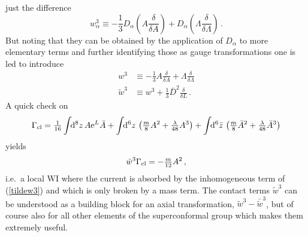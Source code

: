 \documentclass[a4paper,12pt]{article}
\newcommand{\e}{{\rm e}}
\newcommand{\dS}{\!\!{\rm d}^6z\,}
\newcommand{\dSb}{\!\!{\rm d}^6\bar z\,}
\newcommand{\dV}{\!\!{\rm d}^8z\,}
\newcommand{\Gcl}{\Gamma_{\rm cl}}
\newcommand{\al}{\alpha}
\newcommand{\tfr}[2]{{\textstyle \frac{#1}{#2}}}
\newcommand{\fdq}[2]{\frac{\delta #1}{\delta #2}}
\begin{document}
just the difference
\begin{equation}
w_\al^3 \equiv -\tfr{1}{3} D_\al \left( A \fdq{}{A} \right) + D_\al
\left(\Lambda \fdq{}{\Lambda}\right) \,.
\end{equation}
But noting that they can be obtained by the application of $D_\al$ to more
elementary terms and further identifying those as gauge transformations one
is led to introduce
\begin{align}
  w^3 &\equiv -\tfr{1}{3} A \fdq{}{A} + \Lambda \fdq{}{\Lambda} \\
\tilde w^3 &\equiv w^3 +\tfr{1}{3} \bar D^2 \fdq{}{L} \,.
\label{tildew3}
\end{align}
A quick check on
\begin{equation}
\Gcl = \tfr{1}{16} \int \dV A \e^{L} \bar A 
+ \int \dS \left(\tfr{m}{8} A^2 +
  \tfr{\lambda}{48} A^3 \right) 
 + \int \dSb \left(\tfr{m}{8} \bar A^2 +   \tfr{\lambda}{48} \bar A^3 \right)
\end{equation}
yields
\begin{equation}
\tilde w^3 \Gcl = -\tfr{m}{12} A^2\,, \label{tw3WIclass}
\end{equation}
i.e.\ a local WI where the current is absorbed by the inhomogeneous term of
(\ref{tildew3}) and which is only broken by a mass term.
The contact terms $\tilde w^3$ can be understood as a building block for an
axial transformation, $\tilde w^3- \bar{\tilde w}^3$, but of course also
for all other elements of the superconformal group which makes them
extremely useful.
\end{document}

